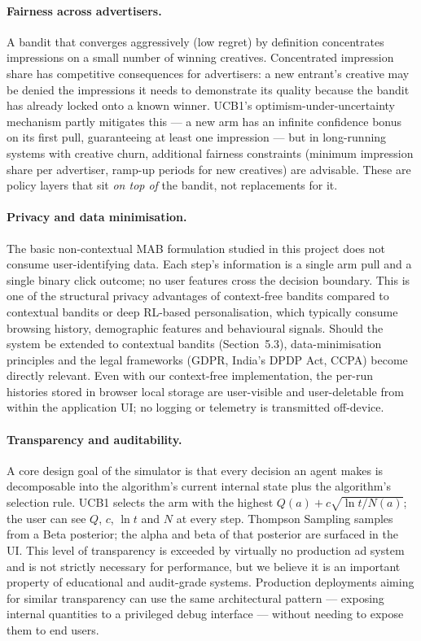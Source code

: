 \paragraph{Fairness across advertisers.}
A bandit that converges aggressively (low regret) by definition concentrates impressions on a small number of winning creatives. Concentrated impression share has competitive consequences for advertisers: a new entrant's creative may be denied the impressions it needs to demonstrate its quality because the bandit has already locked onto a known winner. UCB1's optimism-under-uncertainty mechanism partly mitigates this --- a new arm has an infinite confidence bonus on its first pull, guaranteeing at least one impression --- but in long-running systems with creative churn, additional fairness constraints (minimum impression share per advertiser, ramp-up periods for new creatives) are advisable. These are policy layers that sit \emph{on top of} the bandit, not replacements for it.

\paragraph{Privacy and data minimisation.}
The basic non-contextual MAB formulation studied in this project does not consume user-identifying data. Each step's information is a single arm pull and a single binary click outcome; no user features cross the decision boundary. This is one of the structural privacy advantages of context-free bandits compared to contextual bandits or deep RL-based personalisation, which typically consume browsing history, demographic features and behavioural signals. Should the system be extended to contextual bandits (Section~5.3), data-minimisation principles and the legal frameworks (GDPR, India's DPDP Act, CCPA) become directly relevant. Even with our context-free implementation, the per-run histories stored in browser local storage are user-visible and user-deletable from within the application UI; no logging or telemetry is transmitted off-device.

\paragraph{Transparency and auditability.}
A core design goal of the simulator is that every decision an agent makes is decomposable into the algorithm's current internal state plus the algorithm's selection rule. UCB1 selects the arm with the highest $Q(a) + c\sqrt{\ln t / N(a)}$; the user can see $Q$, $c$, $\ln t$ and $N$ at every step. Thompson Sampling samples from a Beta posterior; the alpha and beta of that posterior are surfaced in the UI. This level of transparency is exceeded by virtually no production ad system and is not strictly necessary for performance, but we believe it is an important property of educational and audit-grade systems. Production deployments aiming for similar transparency can use the same architectural pattern --- exposing internal quantities to a privileged debug interface --- without needing to expose them to end users.

